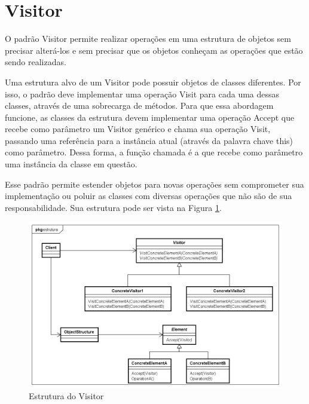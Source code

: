 \section{Visitor}

O padrão Visitor permite realizar 
operações em uma estrutura de objetos sem precisar alterá-los 
e sem precisar que os objetos conheçam as 
operações que estão sendo realizadas. \cite{gamma:1995}

Uma estrutura alvo de um Visitor pode possuir objetos de 
classes diferentes. Por isso, o padrão deve implementar 
uma operação Visit para cada uma dessas classes, 
através de uma sobrecarga de métodos. Para que essa 
abordagem funcione, as classes da estrutura devem implementar 
uma operação Accept que recebe como parâmetro um 
Visitor genérico e chama sua operação Visit, 
passando uma referência para a instância atual 
(através da palavra chave this) 
como parâmetro. Dessa forma, a função chamada é a 
que recebe como parâmetro uma instância da 
classe em questão.

Esse padrão permite estender objetos para novas operações 
sem comprometer sua implementação ou poluir as classes com 
diversas operações que não são de sua responsabilidade. 
Sua estrutura pode ser vista na Figura \ref{visitor_struct}.

\begin{figure}[htb]
	\caption{\label{visitor_struct}Estrutura do Visitor}
	\begin{center}
	    \includegraphics[scale=0.5]{5_padroes-contexto-funcional/5.3_comportamentais/5.3.11_visitor/visitor_estrutura.png}
	\end{center}
\end{figure}

